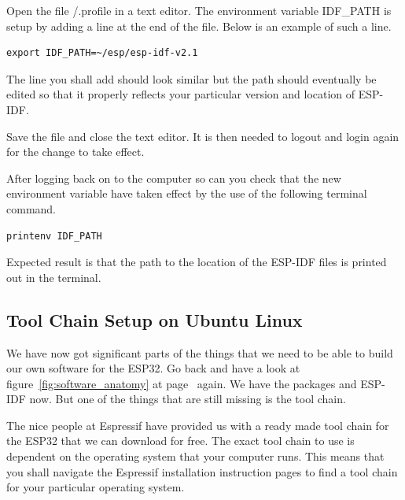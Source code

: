 \documentclass{tufte-book}
\begin{document}
Open the file \texttildelow/.profile in a text editor. The environment variable IDF\_PATH is setup by adding a line at the end of the file. Below is an example of such a line.


\begin{lstlisting}
export IDF_PATH=~/esp/esp-idf-v2.1
\end{lstlisting}

The line you shall add should look similar but the path should  eventually be edited so that it properly reflects your particular version and location of ESP-IDF.

Save the file and close the text editor. It is then needed to logout and login again for the change to take effect.

After logging back on to the computer so can you check that the new environment variable have taken effect by the use of the following terminal command.

\begin{lstlisting}
printenv IDF_PATH
\end{lstlisting}

Expected result is that the path to the location of the ESP-IDF files is printed out in the terminal.

\subsection{Tool Chain Setup on Ubuntu Linux}

We have now got significant parts of the things that we need to be able to build our own software for the ESP32. Go back and have a look at figure~\ref{fig:software_anatomy} at page~\pageref{fig:software_anatomy} again. We have the packages and ESP-IDF now. But one of the things that are still missing is the tool chain.

The nice people at Espressif have provided us with a ready made tool chain for the ESP32 that we can download for free. The exact tool chain to use is dependent on the operating system that your computer runs. This means that you shall navigate the Espressif installation instruction pages to find a tool chain for your particular operating system.
\end{document}
